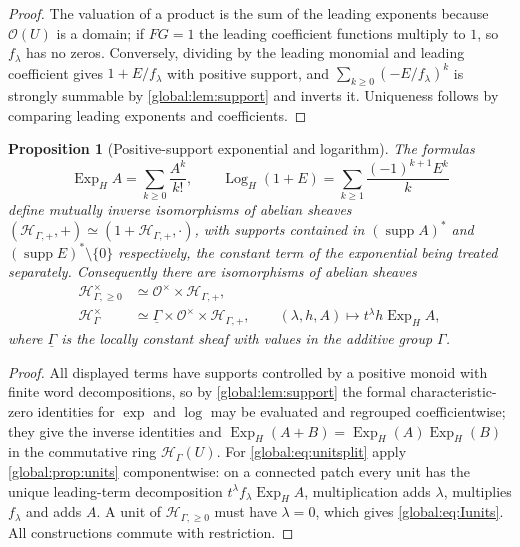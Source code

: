 \documentclass[11pt,letterpaper]{article}
\newtheorem{proposition}[proposition]{Proposition}
\theoremstyle{definition}
\theoremstyle{remark}
\newcommand{\OO}{\mathcal O}
\newcommand{\HH}{\mathscr H_\Gamma}
\newcommand{\HP}{\mathscr H_{\Gamma,+}}
\newcommand{\HI}{\mathscr H_{\Gamma,\ge0}}
\newcommand{\supp}{\operatorname{supp}}
\newcommand{\ExpH}{\operatorname{Exp}_{H}}
\newcommand{\LogH}{\operatorname{Log}_{H}}
\numberwithin{equation}{section}
\begin{document}
\begin{proof}
The valuation of a product is the sum of the leading exponents because $\OO(U)$ is a domain; if $FG=1$ the leading coefficient functions multiply to $1$, so $f_\lambda$ has no zeros. Conversely, dividing by the leading monomial and leading coefficient gives $1+E/f_\lambda$ with positive support, and $\sum_{k\ge0}(-E/f_\lambda)^k$ is strongly summable by \cref{global:lem:support} and inverts it. Uniqueness follows by comparing leading exponents and coefficients.
\end{proof}

\begin{proposition}[Positive-support exponential and logarithm]\label{global:prop:explog}
The formulas
\begin{equation}\label{global:eq:explog}
  \ExpH A=\sum_{k\ge0}\frac{A^k}{k!},
  \qquad
  \LogH(1+E)=\sum_{k\ge1}\frac{(-1)^{k+1}E^k}{k}
\end{equation}
define mutually inverse isomorphisms of abelian sheaves $(\HP,+)\simeq(1+\HP,\cdot)$, with supports contained in $(\supp A)^*$ and $(\supp E)^*\setminus\{0\}$ respectively, the constant term of the exponential being treated separately. Consequently there are isomorphisms of abelian sheaves
\begin{align}
  \HI^\times&\simeq\OO^\times\times\HP,\label{global:eq:Iunits}\\
  \HH^\times&\simeq\underline\Gamma\times\OO^\times\times\HP,
  \qquad (\lambda,h,A)\longmapsto t^\lambda h\ExpH A,\label{global:eq:unitsplit}
\end{align}
where $\underline\Gamma$ is the locally constant sheaf with values in the additive group $\Gamma$.
\end{proposition}

\begin{proof}
All displayed terms have supports controlled by a positive monoid with finite word decompositions, so by \cref{global:lem:support} the formal characteristic-zero identities for $\exp$ and $\log$ may be evaluated and regrouped coefficientwise; they give the inverse identities and $\ExpH(A+B)=\ExpH(A)\ExpH(B)$ in the commutative ring $\HH(U)$. For \eqref{global:eq:unitsplit} apply \cref{global:prop:units} componentwise: on a connected patch every unit has the unique leading-term decomposition $t^\lambda f_\lambda\ExpH A$, multiplication adds $\lambda$, multiplies $f_\lambda$ and adds $A$. A unit of $\HI$ must have $\lambda=0$, which gives \eqref{global:eq:Iunits}. All constructions commute with restriction.
\end{proof}
\end{document}
